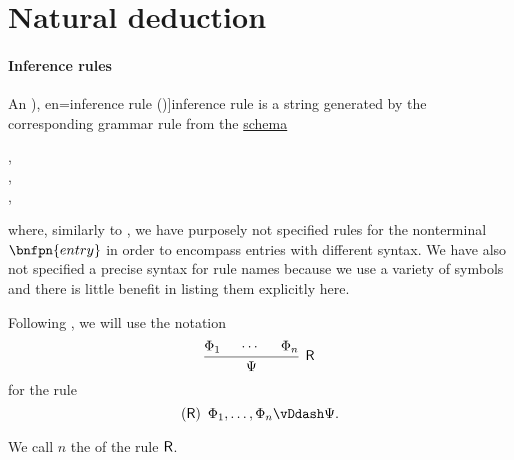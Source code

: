 \section{Natural deduction}\label{sec:natural_deduction}

\paragraph{Inference rules}

\begin{definition}\label{def:inference_rule}\mimprovised
  An \term[ru=правило вывода (\cite[31]{Герасимов2011Вычислимость}), en=inference rule (\cite[2]{MartinLöf1996LogicalLaws})]{inference rule} is a string generated by the corresponding grammar rule from the \hyperref[def:formal_grammar/schema]{schema}
  \begin{bnf*}
         { \bnfor {} \bnfsp \bnftsq{,} \bnfsp {}}, \\
           {\bnfes \bnfor {}}, \\
         {}, \\
     {\bnftsq{(} \bnfsp {} \bnfsp \bnftsq{)} \bnfsp {} \bnfsp \bnftsq{\( \vDdash \)} \bnfsp {}}
  \end{bnf*}
  where, similarly to , we have purposely not specified rules for the nonterminal \( \bnfpn{entry} \) in order to encompass entries with different syntax. We have also not specified a precise syntax for rule names because we use a variety of symbols and there is little benefit in listing them explicitly here.

  Following , we will use the notation
  \begin{equation*}
    \begin{prooftree}
      \hypo{ \Phi_1 }
      \hypo{ \cdots }
      \hypo{ \Phi_n }
      \infer3[\logic{R}]{ \Psi }
    \end{prooftree}
  \end{equation*}
  for the rule
  \begin{equation*}
    (\logic{R}) \enspace \Phi_1, \ldots, \Phi_n \vDdash \Psi.
  \end{equation*}

  We call \( n \) the  of the rule \( \textsf{R} \).
\end{definition}
